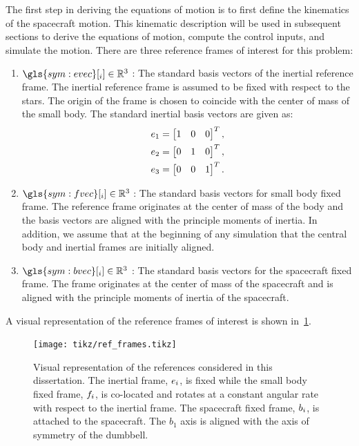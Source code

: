The first step in deriving the equations of motion is to first define the \gls{kinematics} of the spacecraft motion.
This kinematic description will be used in subsequent sections to derive the equations of motion, compute the control inputs, and simulate the motion.
There are three reference frames of interest for this problem:
\begin{enumerate}
    \item \( \gls{sym:evec}[_i] \in \R^3 \) : The standard basis vectors of the inertial reference frame.
        The inertial reference frame is assumed to be fixed with respect to the stars. 
        The origin of the frame is chosen to coincide with the center of mass of the small body.
        The standard inertial basis vectors are given as:
        \begin{align*}
            e_{1} &= \begin{bmatrix} 1 & 0 & 0 \end{bmatrix}^T, \\
            e_{2} &= \begin{bmatrix} 0 & 1 & 0 \end{bmatrix}^T, \\
            e_{3} &= \begin{bmatrix} 0 & 0 & 1 \end{bmatrix}^T.
        \end{align*}
    \item \( \gls{sym:fvec}[_i] \in \R^3 \) : The standard basis vectors for small body fixed frame.
        The reference frame originates at the center of mass of the body and the basis vectors are aligned with the principle moments of inertia. 
        In addition, we assume that at the beginning of any simulation that the central body and inertial frames are initially aligned.
    \item \( \gls{sym:bvec}[_i] \in \R^3 \) : The standard basis vectors for the spacecraft fixed frame.
        The frame originates at the center of mass of the spacecraft and is aligned with the principle moments of inertia of the spacecraft.
\end{enumerate}
A visual representation of the reference frames of interest is shown in~\cref{fig:reference_frames}.
\begin{figure}
    \centering
    \texttt{[image: tikz/ref\_frames.tikz]}
    \caption{Visual representation of the references considered in this dissertation.
    The inertial frame, \( e_i \), is fixed while the small body fixed frame, \( f_i \), is co-located and rotates at a constant angular rate with respect to the inertial frame.
The spacecraft fixed frame, \( b_i \), is attached to the spacecraft.
The \( b_1 \) axis is aligned with the axis of symmetry of the dumbbell.\label{fig:reference_frames}}
\end{figure}

